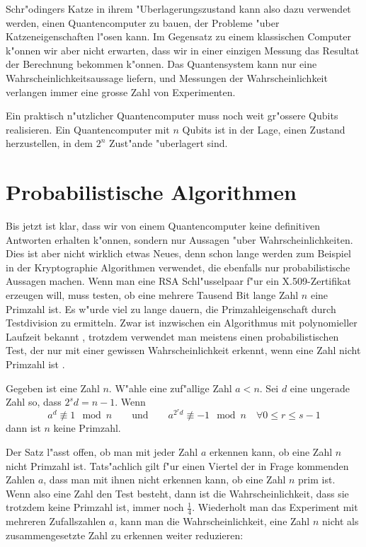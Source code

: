 Schr"odingers Katze in ihrem "Uberlagerungszustand kann also dazu
verwendet werden, einen Quantencomputer zu bauen, der Probleme "uber
Katzeneigenschaften l"osen kann.
Im Gegensatz zu einem klassischen Computer k"onnen wir aber nicht
erwarten, dass wir in einer einzigen Messung das Resultat der
Berechnung bekommen k"onnen.
Das Quantensystem kann nur eine Wahrscheinlichkeitsaussage liefern,
und Messungen der Wahrscheinlichkeit verlangen immer eine grosse Zahl
von Experimenten.

Ein praktisch n"utzlicher Quantencomputer muss noch weit gr"ossere
Qubits realisieren.
Ein Quantencomputer mit $n$ Qubits ist in der Lage, einen Zustand
herzustellen, in dem $2^n$ Zust"ande "uberlagert sind. 

\section{Probabilistische Algorithmen}
Bis jetzt ist klar, dass wir von einem Quantencomputer keine definitiven
Antworten erhalten k"onnen, sondern nur Aussagen "uber Wahrscheinlichkeiten.
Dies ist aber nicht wirklich etwas Neues, denn schon lange werden
zum Beispiel in der Kryptographie Algorithmen verwendet, die ebenfalls
nur probabilistische Aussagen machen.
Wenn man eine RSA Schl"usselpaar f"ur ein X.509-Zertifikat erzeugen will,
muss testen, ob eine mehrere Tausend Bit lange Zahl $n$ eine Primzahl ist.
Es w"urde viel zu lange dauern, die Primzahleigenschaft durch Testdivision 
zu ermitteln.
Zwar ist inzwischen ein Algorithmus mit polynomieller Laufzeit
bekannt \cite{skript:aks}, trotzdem
verwendet man meistens einen probabilistischen Test, der nur mit einer
gewissen Wahrscheinlichkeit erkennt, wenn eine Zahl nicht Primzahl ist
\cite{skript:miller-rabin}.

\begin{satz}
\label{skript:quantencomputer:miller-rabin-kriterium}
Gegeben ist eine Zahl $n$. W"ahle eine zuf"allige Zahl $a<n$. Sei $d$
eine ungerade Zahl so, dass $2^sd=n-1$. Wenn 
\[
a^d\not\equiv 1\mod n
\qquad\text{und}\qquad
a^{2^rd}\not\equiv -1\mod n\quad\forall 0\le r\le s-1
\]
dann ist $n$ keine Primzahl.
\end{satz}

Der Satz l"asst offen, ob man mit jeder Zahl $a$ erkennen kann, ob
eine Zahl $n$ nicht Primzahl ist.
Tats"achlich gilt f"ur einen Viertel der in Frage kommenden Zahlen
$a$, dass man mit ihnen nicht erkennen kann, ob eine Zahl $n$ prim ist.
Wenn also eine Zahl den Test besteht, dann ist die Wahrscheinlichkeit,
dass sie trotzdem keine Primzahl ist, immer noch $\frac14$. Wiederholt
man das Experiment mit mehreren Zufallszahlen $a$, kann man die
Wahrscheinlichkeit, eine Zahl $n$ nicht als zusammengesetzte Zahl zu
erkennen weiter reduzieren:

